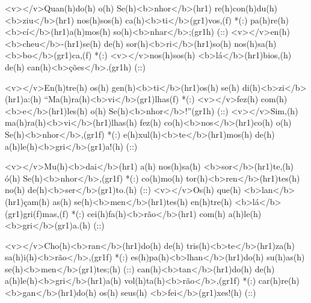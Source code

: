<v></v>Quan(h)do(h) o(h) Se(h)<b>nhor</b>(hr1) re(h)con(h)du(h)<b>ziu</b>(hr1) nos(h)sos(h) ca(h)<b>ti</b>(gr1)vos,(f) *(:)
pa(h)re(h)<b>cí</b>(hr1)a(h)mos(h) so(h)<b>nhar</b>;(gr1h) (::)
<v></v>en(h)<b>cheu</b>-(hr1)se(h) de(h) sor(h)<b>ri</b>(hr1)so(h) nos(h)sa(h) <b>bo</b>(gr1)ca,(f) *(:)
<v></v>nos(h)sos(h) <b>lá</b>(hr1)bios,(h) de(h) can(h)<b>ções</b>.(gr1h) (::)

<v></v>En(h)tre(h) os(h) gen(h)<b>ti</b>(hr1)os(h) se(h) di(h)<b>zi</b>(hr1)a:(h) ``Ma(h)ra(h)<b>vi</b>(gr1)lhas(f) *(:)
<v></v>fez(h) com(h) <b>e</b>(hr1)les(h) o(h) Se(h)<b>nhor</b>!''(gr1h) (::)
<v></v>Sim,(h) ma(h)ra(h)<b>vi</b>(hr1)lhas(h) fez(h) co(h)<b>nos</b>(hr1)co(h) o(h) Se(h)<b>nhor</b>,(gr1f) *(:)
e(h)xul(h)<b>te</b>(hr1)mos(h) de(h) a(h)le(h)<b>gri</b>(gr1)a!(h) (::)

<v></v>Mu(h)<b>dai</b>(hr1) a(h) nos(h)sa(h) <b>sor</b>(hr1)te,(h) ó(h) Se(h)<b>nhor</b>,(gr1f) *(:)
co(h)mo(h) tor(h)<b>ren</b>(hr1)tes(h) no(h) de(h)<b>ser</b>(gr1)to.(h) (::)
<v></v>Os(h) que(h) <b>lan</b>(hr1)çam(h) as(h) se(h)<b>men</b>(hr1)tes(h) en(h)tre(h) <b>lá</b>(gr1)gri(f)mas,(f) *(:)
cei(h)fa(h)<b>rão</b>(hr1) com(h) a(h)le(h)<b>gri</b>(gr1)a.(h) (::)

<v></v>Cho(h)<b>ran</b>(hr1)do(h) de(h) tris(h)<b>te</b>(hr1)za(h) sa(h)i(h)<b>rão</b>,(gr1f) *(:)
es(h)pa(h)<b>lhan</b>(hr1)do(h) su(h)as(h) se(h)<b>men</b>(gr1)tes;(h) (::)
can(h)<b>tan</b>(hr1)do(h) de(h) a(h)le(h)<b>gri</b>(hr1)a(h) vol(h)ta(h)<b>rão</b>,(gr1f) *(:)
car(h)re(h)<b>gan</b>(hr1)do(h) os(h) seus(h) <b>fei</b>(gr1)xes!(h) (::)
